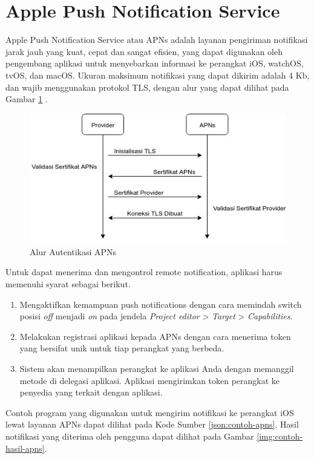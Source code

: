\section{Apple Push Notification Service}
\par Apple Push Notification Service atau APNs adalah layanan pengiriman notifikasi jarak jauh yang kuat, cepat dan sangat efisien, yang dapat digunakan oleh pengembang aplikasi untuk menyebarkan informasi ke perangkat iOS, watchOS, tvOS, dan macOS. Ukuran maksimum notifikasi yang dapat dikirim adalah 4 Kb, dan wajib menggunakan protokol TLS, dengan alur yang dapat dilihat pada Gambar \ref{img:apns-certificate} \cite{apns-online}.
\begin{figure}[H]
	\centering\includegraphics[width=1\textwidth]{bab2/img/activity-apns_certificate_connection.jpg}
	\caption{Alur Autentikasi APNs}
	\label{img:apns-certificate}
\end{figure}
\par Untuk dapat menerima dan mengontrol remote notification, aplikasi harus memenuhi syarat sebagai berikut.
\begin{enumerate}
	\item Mengaktifkan kemampuan push notifications dengan cara memindah switch posisi \textit{off} menjadi \textit{on} pada jendela \textit{Project editor} > \textit{Target} > \textit{Capabilities}.
	\item Melakukan registrasi aplikasi kepada APNs dengan cara menerima token yang bersifat unik untuk tiap perangkat yang berbeda.
	\item Sistem akan menampilkan perangkat ke aplikasi Anda dengan memanggil metode di delegasi aplikasi. Aplikasi mengirimkan token perangkat ke penyedia yang terkait dengan aplikasi.
\end{enumerate}
\par Contoh program yang digunakan untuk mengirim notifikasi ke perangkat iOS lewat layanan APNs dapat dilihat pada Kode Sumber \ref{json:contoh-apns}. Hasil notifikasi yang diterima oleh pengguna dapat dilihat pada Gambar \ref{img:contoh-hasil-apns}.
